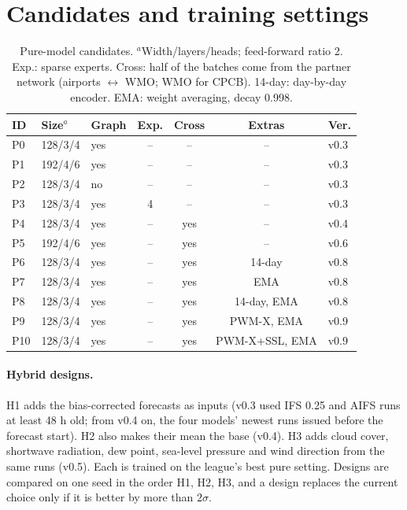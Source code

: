 \section{Candidates and training settings}\label{app:variants}

\begin{table}[h]
\caption{Pure-model candidates. $^a$Width/layers/heads; feed-forward ratio 2. Exp.: sparse experts. Cross: half of the batches come from the
partner network (airports $\leftrightarrow$ WMO; WMO for CPCB). 14-day: day-by-day encoder. EMA: weight averaging,
decay 0.998.}
\label{tab:variants}
\small
\setlength{\tabcolsep}{2.5pt}
\begin{tabular}{@{}lllcccl@{}}
\toprule
ID & Size$^a$ & Graph & Exp. & Cross & Extras & Ver. \\
\midrule
P0 & 128/3/4 & yes & -- & -- & -- & v0.3 \\
P1 & 192/4/6 & yes & -- & -- & -- & v0.3 \\
P2 & 128/3/4 & no & -- & -- & -- & v0.3 \\
P3 & 128/3/4 & yes & 4 & -- & -- & v0.3 \\
P4 & 128/3/4 & yes & -- & yes & -- & v0.4 \\
P5 & 192/4/6 & yes & -- & yes & -- & v0.6 \\
P6 & 128/3/4 & yes & -- & yes & 14-day & v0.8 \\
P7 & 128/3/4 & yes & -- & yes & EMA & v0.8 \\
P8 & 128/3/4 & yes & -- & yes & 14-day, EMA & v0.8 \\
P9 & 128/3/4 & yes & -- & yes & PWM-X, EMA & v0.9 \\
P10 & 128/3/4 & yes & -- & yes & PWM-X+SSL, EMA & v0.9 \\
\bottomrule
\end{tabular}
\end{table}

\paragraph{Hybrid designs.}
H1 adds the bias-corrected forecasts as inputs (v0.3 used IFS 0.25 and AIFS runs at least 48 h old; from v0.4 on,
the four models' newest runs issued before the forecast start). H2 also makes their mean the base (v0.4). H3 adds
cloud cover, shortwave radiation, dew point, sea-level pressure and wind direction from the same runs (v0.5). Each
is trained on the league's best pure setting. Designs are compared on one seed in the order H1, H2, H3, and a design
replaces the current choice only if it is better by more than $2\sigma$.

